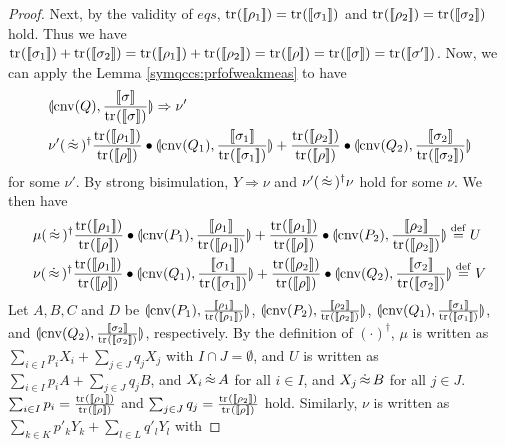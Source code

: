 \begin{proof}
 Next, by the validity of $\mathit{eqs}$,
 ${\rm tr}_{}([\![\rho_1]\!]) = {\rm tr}_{}([\![\sigma_1]\!])$ and
 ${\rm tr}_{}([\![\rho_2]\!]) = {\rm tr}_{}([\![\sigma_2]\!])$ hold.
 Thus we have $\tr{}{\braw{\sigma_1}} + \tr{}{\braw{\sigma_2}} = 
 \tr{}{\braw{\rho_1}} + \tr{}{\braw{\rho_2}} = 
 \tr{}{\braw{\rho}} = \tr{}{\braw{\sigma}} = \tr{}{\braw{\sigma'}}$.
 Now, we can apply the Lemma \ref{symqccs:prfofweakmeas} to have
\begin{align*}
&\con{\cnv{Q}}{\frac{\braw{\sigma}}{\tr{}{\braw{\sigma}}}}
 \Rightarrow
 \nu'\\
&\nu'
 (\strg)^\dagger
 \frac{\tr{}{\braw{\rho_1}}}{\tr{}{\braw{\rho}}} \bullet
 \con{\cnv{Q_1}}{\frac{\braw{\sigma_1}}{\tr{}{\braw{\sigma_1}}}}
 +\frac{\tr{}{\braw{\rho_2}}}{\tr{}{\braw{\rho}}} \bullet
 \con{\cnv{Q_2}}{\frac{\braw{\sigma_2}}{\tr{}{\braw{\sigma_2}}}}
\end{align*}
for some $\nu'$.
By strong bisimulation, 
$Y \Rightarrow \nu$ and $\nu' (\,\dot\approx\,)^\dagger \nu$ hold for some
$\nu$.  We then have
\begin{align*}
 &\mu 
 (\strg)^\dagger 
 \frac{\tr{}{\braw{\rho_1}}}{\tr{}{\braw{\rho}}}
 \bullet 
 \con{\cnv{P_1}}
 {\frac{\braw{\rho_1}}{\tr{}{\braw{\rho_1}}}} + 
 \frac{\tr{}{\braw{\rho_1}}}{\tr{}{\braw{\rho}}}
 \bullet 
 \con{\cnv{P_2}}
 {\frac{\braw{\rho_2}}{\tr{}{\braw{\rho_2}}}} \defeq U\\
 &\nu
 (\strg)^\dagger
 \frac{\tr{}{\braw{\rho_1}}}{\tr{}{\braw{\rho}}} \bullet
 \con{\cnv{Q_1}}{\frac{\braw{\sigma_1}}{\tr{}{\braw{\sigma_1}}}}
 +\frac{\tr{}{\braw{\rho_2}}}{\tr{}{\braw{\rho}}} \bullet
 \con{\cnv{Q_2}}{\frac{\braw{\sigma_2}}{\tr{}{\braw{\sigma_2}}}}
 \defeq V
\end{align*}
Let $A, B, C$ and $D$ be
$\llparenthesis \mathrm{cnv}(P_1), \frac{[\![\rho_1]\!]}{{\rm tr}_{}([\![\rho_1]\!])} \rrparenthesis$,
$\llparenthesis \mathrm{cnv}(P_2), \frac{[\![\rho_2]\!]}{{\rm tr}_{}([\![\rho_2]\!])} \rrparenthesis$,
$\llparenthesis \mathrm{cnv}(Q_1), \frac{[\![\sigma_1]\!]}{{\rm tr}_{}([\![\sigma_1]\!])} \rrparenthesis$,
and
$\llparenthesis \mathrm{cnv}(Q_2), \frac{[\![\sigma_2]\!]}{{\rm tr}_{}([\![\sigma_2]\!])} \rrparenthesis$,
respectively.
By the definition of $(\cdot)^\dagger$, $\mu$ is written as\\
$\sum_{i \in I}p_i X_i + \sum_{j \in J}q_j X_j$ with 
$I \cap J = \emptyset$, and
$U$ is written as $\sum_{i \in I}p_i A + \sum_{j \in J}q_j B$, and
$X_i \,\dot\approx\, A$ for all $i \in I$, and
$X_j \,\dot\approx\, B$ for all $j \in J$. 
$\sum_{i \in I} p_i = \frac{{\rm tr}_{}([\![\rho_1]\!])}{{\rm tr}_{}([\![\rho]\!])}$
 and
$\sum_{j \in J} q_j =
\frac{{\rm tr}_{}([\![\rho_2]\!])}{{\rm tr}_{}([\![\rho]\!])}$ hold.
Similarly,
$\nu$ is written as\\
$\sum_{k \in K}p'_k Y_k + \sum_{l \in L}q'_l Y_l$ with 

\end{proof}
